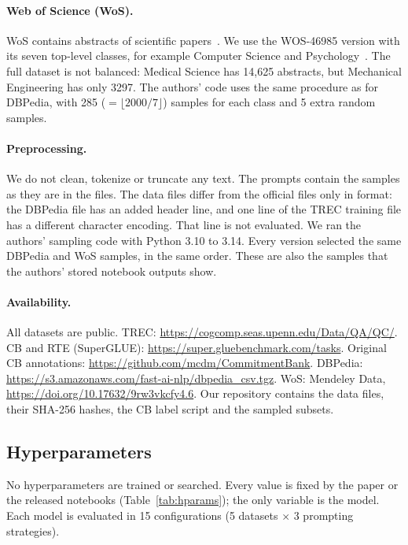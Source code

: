 \paragraph{Web of Science (WoS).}
WoS contains abstracts of scientific papers~\cite{Kowsari:2017}. We use the
WOS-46985 version with its seven top-level classes, for example Computer
Science and Psychology~\cite{Kowsari:2018}. The full dataset is not balanced:
Medical Science has 14{,}625 abstracts, but Mechanical Engineering has only
3297. The authors' code uses the same procedure as for DBPedia, with
285 ($= \lfloor 2000/7 \rfloor$) samples for each class and 5 extra random
samples.

\paragraph{Preprocessing.}

We do not clean, tokenize or truncate any text. The prompts contain the
samples as they are in the files. The data files differ from the official files
only in format: the DBPedia file has an added header line, and one line of the
TREC training file has a different character encoding. That line is not
evaluated. We ran the authors' sampling code with Python 3.10 to 3.14. Every
version selected the same DBPedia and WoS samples, in the same order. These are
also the samples that the authors' stored notebook outputs show.

\paragraph{Availability.}

All datasets are public. TREC:
\url{https://cogcomp.seas.upenn.edu/Data/QA/QC/}. CB and RTE (SuperGLUE):
\url{https://super.gluebenchmark.com/tasks}. Original CB annotations:
\url{https://github.com/mcdm/CommitmentBank}. DBPedia:
\url{https://s3.amazonaws.com/fast-ai-nlp/dbpedia_csv.tgz}. WoS: Mendeley Data,
\url{https://doi.org/10.17632/9rw3vkcfy4.6}. Our repository contains the data
files, their SHA-256 hashes, the CB label script and the sampled subsets.

\subsection{Hyperparameters}
\label{sec:hparams}
No hyperparameters are trained or searched. Every value is fixed by the paper
or the released notebooks (Table~\ref{tab:hparams}); the only variable is the
model. Each model is evaluated in 15 configurations (5 datasets $\times$ 3
prompting strategies).

